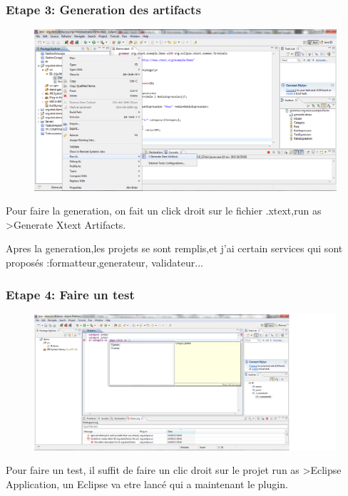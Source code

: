 \documentclass{article}
\begin{document}
 \subsubsection{Etape 3: Generation des artifacts}

\begin{figure}[h]
	\centering
		\includegraphics[width=1.10\textwidth]{3.png}
	\label{fig:3}
\end{figure}\FloatBarrier

Pour faire la generation, on fait un click droit sur le fichier .xtext,run as >Generate Xtext Artifacts.

Apres la generation,les projets se sont remplis,et j'ai certain services qui sont proposés :formatteur,generateur, validateur...


 \subsubsection{Etape 4: Faire un test}

\begin{figure}[h]
	\centering
		\includegraphics[width=1.10\textwidth]{4.png}
	\label{fig:4}
\end{figure}\FloatBarrier


Pour faire un test, il suffit de faire un clic droit sur le projet run as >Eclipse Application, un Eclipse va etre lancé qui a maintenant le plugin.
\end{document}
